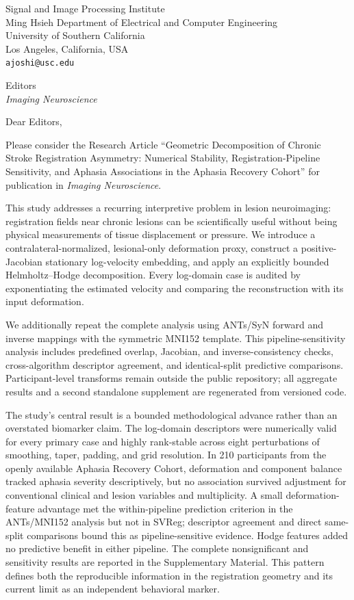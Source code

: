 \documentclass[10pt]{article}
\begin{document}
\begin{flushright}
Signal and Image Processing Institute\\
Ming Hsieh Department of Electrical and Computer Engineering\\
University of Southern California\\
Los Angeles, California, USA\\
\texttt{ajoshi@usc.edu}
\end{flushright}

Editors\\
\emph{Imaging Neuroscience}

Dear Editors,

Please consider the Research Article ``Geometric Decomposition of Chronic
Stroke Registration Asymmetry: Numerical Stability, Registration-Pipeline Sensitivity, and Aphasia
Associations in the Aphasia Recovery Cohort'' for publication in
\emph{Imaging Neuroscience}.

This study addresses a recurring interpretive problem in lesion neuroimaging:
registration fields near chronic lesions can be scientifically useful without
being physical measurements of tissue displacement or pressure. We introduce a
contralateral-normalized, lesional-only deformation proxy, construct a
positive-Jacobian stationary log-velocity embedding, and apply an explicitly
bounded Helmholtz--Hodge decomposition. Every log-domain case is audited by
exponentiating the estimated velocity and comparing the reconstruction with its
input deformation.

We additionally repeat the complete analysis using ANTs/SyN forward and inverse
mappings with the symmetric MNI152 template. This pipeline-sensitivity
analysis includes predefined overlap, Jacobian, and inverse-consistency checks,
cross-algorithm descriptor agreement, and identical-split predictive
comparisons. Participant-level transforms remain outside the public repository;
all aggregate results and a second standalone supplement are regenerated from
versioned code.

The study's central result is a bounded methodological advance rather than an
overstated biomarker claim. The log-domain descriptors were numerically valid
for every primary case and highly rank-stable across eight perturbations of
smoothing, taper, padding, and grid resolution. In 210 participants from the
openly available Aphasia Recovery Cohort, deformation and component balance
tracked aphasia severity descriptively, but no association survived adjustment
for conventional clinical and lesion variables and multiplicity. A small
deformation-feature advantage met the within-pipeline prediction criterion in
the ANTs/MNI152 analysis but not in SVReg; descriptor agreement and direct
same-split comparisons bound this as pipeline-sensitive evidence. Hodge
features added no predictive benefit in either pipeline. The complete
nonsignificant and sensitivity results are reported in the Supplementary
Material. This pattern defines both the reproducible information in the
registration geometry and its current limit as an independent behavioral
marker.
\end{document}
